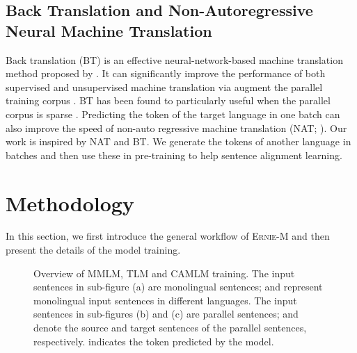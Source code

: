 \documentclass[11pt]{article}
\begin{document}
\subsection{Back Translation and Non-Autoregressive Neural Machine Translation}
Back translation (BT) is an effective neural-network-based machine translation method proposed by \citet{sennrich2015improving}. It can significantly improve the performance of both supervised and unsupervised machine translation via augment the parallel training corpus \cite{lample2017unsupervised, edunov2018understanding}. BT has been found to particularly useful when the parallel corpus is sparse \cite{karakanta2018neural}. Predicting the token of the target language in one batch can also improve the speed of  non-auto regressive machine translation (NAT; \citealt{gu2017non,wang2019non}). Our work is inspired by NAT and BT. We generate the tokens of another language in batches and then use these in pre-training to help sentence alignment learning. 

\section{Methodology}
In this section, we first introduce the general workflow of \textsc{Ernie-M} and then present the details of the model training.

\begin{figure*}[!t]
\vskip 0.1in
\centering
{}
\caption{Overview of MMLM, TLM and CAMLM training. The input sentences in sub-figure (a) are monolingual sentences;  and  represent monolingual input sentences in different languages. The input sentences in sub-figures (b) and (c) are parallel sentences;  and  denote the source and target sentences of the parallel sentences, respectively.   indicates the token predicted by the model.}
\vspace{-0.15in}
\label{fig1}
\end{figure*}
\end{document}
